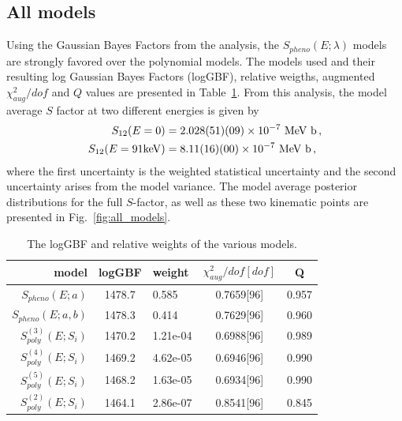 \documentclass[prd,10pt,superscriptaddress,notitlepage,tightenlines,nofootinbib,floatfix]{revtex4-1}
\begin{document}
\subsection{All models}
Using the Gaussian Bayes Factors from the analysis, the $S_{pheno}(E;\lambda)$ models are strongly favored over the polynomial models.
The models used and their resulting log Gaussian Bayes Factors (logGBF), relative weigths, augmented $\chi^2_{aug}/dof$ and $Q$ values are presented in Table~\ref{tab:all_models}.
From this analysis, the model average $S$ factor at two different energies is given by
\begin{align}\label{eq:all_models}
S_{12}(E=0) &= 2.028(51)(09)\times10^{-7} \textrm{ MeV b}\, ,
\nonumber\\
S_{12}(E=91{\rm keV}) &= 8.11(16)(00)\times10^{-7} \textrm{ MeV b}\, ,
\end{align}
where the first uncertainty is the weighted statistical uncertainty and the second uncertainty arises from the model variance.
The model average posterior distributions for the full $S$-factor, as well as these two kinematic points are presented in Fig.~\ref{fig:all_models}.

\begin{table}
\begin{ruledtabular}
\begin{tabular}{rclcc}
model& logGBF& weight& $\chi_{aug}^2/dof[dof]$& Q\\
\hline
$S_{pheno}(E; a)$       & 1478.7 & 0.585    & 0.7659[96] & 0.957\\
$S_{pheno}(E; a, b)$    & 1478.3 & 0.414    & 0.7629[96] & 0.960\\
$S_{poly}^{(3)}(E; S_i)$& 1470.2 & 1.21e-04 & 0.6988[96] & 0.989\\
$S_{poly}^{(4)}(E; S_i)$& 1469.2 & 4.62e-05 & 0.6946[96] & 0.990\\
$S_{poly}^{(5)}(E; S_i)$& 1468.2 & 1.63e-05 & 0.6934[96] & 0.990\\
$S_{poly}^{(2)}(E; S_i)$& 1464.1 & 2.86e-07 & 0.8541[96] & 0.845\\
\end{tabular}
\end{ruledtabular}
\caption{\label{tab:all_models}
The logGBF and relative weights of the various models.
}
\end{table}
\end{document}
